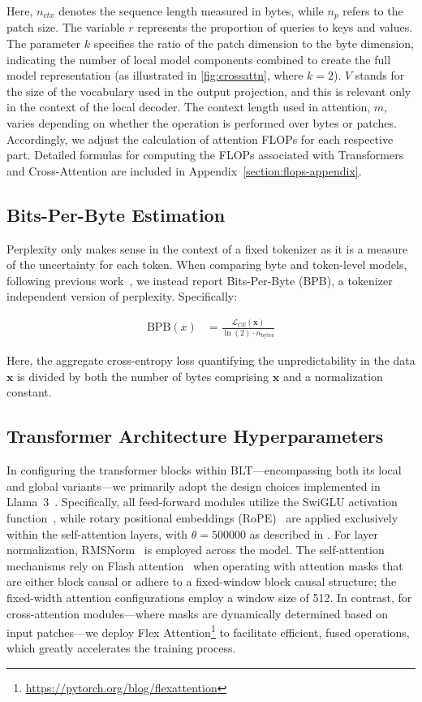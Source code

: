 Here, $n_{ctx}$ denotes the sequence length measured in bytes, while $n_p$ refers to the patch size. The variable $r$ represents the proportion of queries to keys and values. The parameter $k$ specifies the ratio of the patch dimension to the byte dimension, indicating the number of local model components combined to create the full model representation (as illustrated in \autoref{fig:crossattn}, where $k=2$). $V$ stands for the size of the vocabulary used in the output projection, and this is relevant only in the context of the local decoder. The context length used in attention, $m$, varies depending on whether the operation is performed over bytes or patches. Accordingly, we adjust the calculation of attention FLOPs for each respective part. Detailed formulas for computing the FLOPs associated with Transformers and Cross-Attention are included in Appendix~\ref{section:flops-appendix}.

\subsection{Bits-Per-Byte Estimation} Perplexity only makes sense in the context of a fixed tokenizer as it is a measure of the uncertainty for each token. When comparing byte and token-level models, following previous work~\citep{xue2022byt5, yu2023megabyte, wang2024mambabyte}, we instead report Bits-Per-Byte (BPB), a tokenizer independent version of perplexity. Specifically:

\begin{align}
    \text{BPB}(x)&= \frac{\mathcal{L}_{CE}(\pmb{x})}{\ln(2)\cdot n_{\text{bytes}}}
\end{align}

Here, the aggregate cross-entropy loss quantifying the unpredictability in the data $\pmb{x}$ is divided by both the number of bytes comprising $\pmb{x}$ and a normalization constant.

\subsection{Transformer Architecture Hyperparameters} In configuring the transformer blocks within {\textsc BLT}—encompassing both its local and global variants—we primarily adopt the design choices implemented in Llama~3~\citep{dubey2024llama}. Specifically, all feed-forward modules utilize the SwiGLU activation function~\citep{swiglu}, while rotary positional embeddings (RoPE)~\citep{RoPe} are applied exclusively within the self-attention layers, with $\theta=500000$ as described in \citet{xiong2024effective}. For layer normalization, RMSNorm~\citep{RMSNorm} is employed across the model. The self-attention mechanisms rely on Flash attention~\citep{dao2022flashattention} when operating with attention masks that are either block causal or adhere to a fixed-window block causal structure; the fixed-width attention configurations employ a window size of 512. In contrast, for cross-attention modules—where masks are dynamically determined based on input patches—we deploy Flex Attention\footnote{\url{https://pytorch.org/blog/flexattention}} to facilitate efficient, fused operations, which greatly accelerates the training process.

